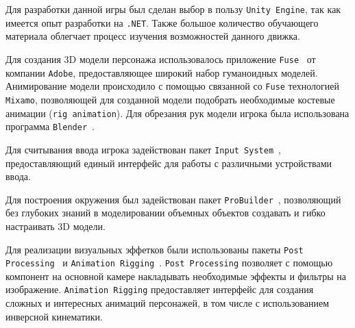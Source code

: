 Для разработки данной игры был сделан выбор в пользу \texttt{Unity Engine}, так как имеется опыт разработки на \texttt{.NET}. Также большое количество обучающего материала облегчает процесс изучения возможностей данного движка.

Для создания 3D модели персонажа использовалось приложение \texttt{Fuse}~\cite{Fuse} от компании \texttt{Adobe}, предоставляющее широкий набор гуманоидных моделей. Анимирование модели происходило с помощью связанной со \texttt{Fuse} технологией \texttt{Mixamo}, позволяющей для созданной модели подобрать необходимые костевые анимации (\texttt{rig animation}). Для обрезания рук модели игрока была использована программа \texttt{Blender}~\cite{Blender}.

Для считывания ввода игрока задействован пакет \texttt{Input System}~\cite{InputSystem}, предоставляющий единый интерфейс для работы с различными устройствами ввода.

Для построения окружения был задействован пакет \texttt{ProBuilder}~\cite{ProBuilder}, позволяющий без глубоких знаний в моделировании объемных объектов создавать и гибко настраивать 3D модели.

Для реализации визуальных эффетков были использованы пакеты \texttt{Post Processing}~\cite{PostProcessing} и \texttt{Animation Rigging}~\cite{AnimationRigging}. \texttt{Post Processing} позволяет с помощью компонент на основной камере накладывать необходимые эффекты и фильтры на изображение. \texttt{Animation Rigging} предоставляет интерфейс для создания сложных и интересных анимаций персонажей, в том числе с использованием инверсной кинематики.




